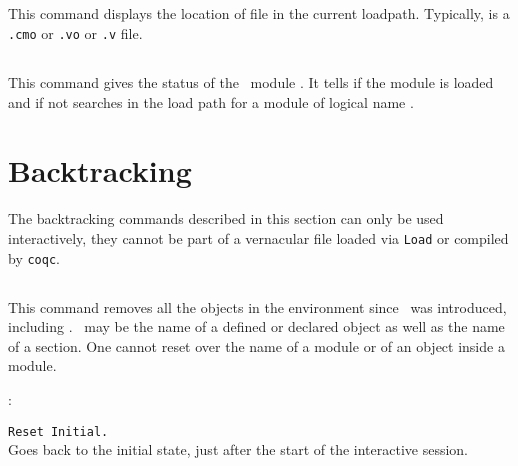 \subsection[\tt Locate File {\str}.]{}
This command displays the location of file {\str} in the current loadpath.
Typically, {\str} is a \texttt{.cmo} or \texttt{.vo} or \texttt{.v} file.

\subsection[\tt Locate Library {\dirpath}.]{}
This command gives the status of the \Coq\ module {\dirpath}. It tells if the
module is loaded and if not searches in the load path for a module
of logical name {\dirpath}.

\section{Backtracking}

The backtracking commands described in this section can only be used
interactively, they cannot be part of a vernacular file loaded via
{\tt Load} or compiled by {\tt coqc}.

\subsection[\tt Reset \ident.]{}
This command removes all the objects in the environment since \ident\ 
was introduced, including \ident. \ident\ may be the name of a defined
or declared object as well as the name of a section. One cannot reset
over the name of a module or of an object inside a module.

\begin{ErrMsgs}
\item \ident: 
\end{ErrMsgs}

\begin{Variants}
 \item {\tt Reset Initial.}\\
   Goes back to the initial state, just after the start of the
   interactive session.
\end{Variants}

\subsection[\tt Back.]{}

